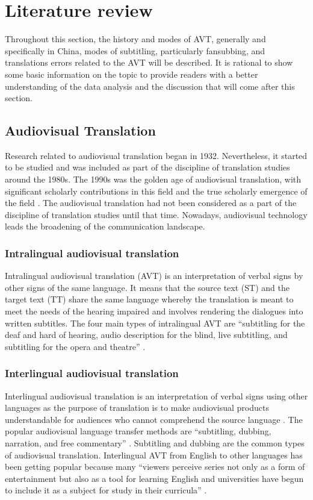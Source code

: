 \documentclass[english]{textolivre}
\begin{document}
\section{Literature review}\label{sec-normas}
Throughout this section, the history and modes of AVT, generally and specifically in China, modes of subtitling, particularly fansubbing, and translations errors related to the AVT will be described. It is rational to show some basic information on the topic to provide readers with a better understanding of the data analysis and the discussion that will come after this section.

\subsection{Audiovisual Translation}\label{sec-conduta}
Research related to audiovisual translation began in 1932. Nevertheless, it started to be studied and was included as part of the discipline of translation studies around the 1980s. The 1990s was the golden age of audiovisual translation, with significant scholarly contributions in this field and the true scholarly emergence of the field \cite{diaz-cintas_introduction-audiovisual_2009}. The audiovisual translation had not been considered as a part of the discipline of translation studies until that time. Nowadays, audiovisual technology leads the broadening of the communication landscape. 


\subsubsection{Intralingual audiovisual translation}\label{sec-fmt-manuscrito}
Intralingual audiovisual translation (AVT) is an interpretation of verbal signs by other signs of the same language. It means that the source text (ST) and the target text (TT) share the same language whereby the translation is meant to meet the needs of the hearing impaired and involves rendering the dialogues into written subtitles. The four main types of intralingual AVT are “subtitling for the deaf and hard of hearing, audio description for the blind, live subtitling, and subtitling for the opera and theatre” \cite[p. 401]{denton_new_2012}.  


\subsubsection{Interlingual audiovisual translation }\label{sec-formato}
Interlingual audiovisual translation is an interpretation of verbal signs using other languages as the purpose of translation is to make audiovisual products understandable for audiences who cannot comprehend the source language \cite{altahri_issues_2013}.
The popular audiovisual language transfer methods are “subtitling, dubbing, narration, and free commentary” \cite[p.~25]{amini_quality_2013}. 
Subtitling and dubbing are the common types of audiovisual translation. Interlingual AVT from English to other languages has been getting popular because many “viewers perceive series not only as a form of entertainment but also as a tool for learning English and universities have begun to include it as a subject for study in their curricula” \cite[p.~33]{amir_dabbaghian_cultural-discourse_2014}.
\end{document}
